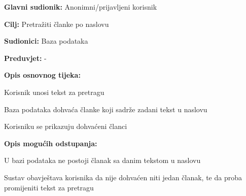 \noindent {}
\begin{packed_item}

\item \textbf{Glavni sudionik:} Anonimni/prijavljeni korisnik
\item  \textbf{Cilj:} Pretražiti članke po naslovu
\item  \textbf{Sudionici:} Baza podataka
\item  \textbf{Preduvjet:} -
\item  \textbf{Opis osnovnog tijeka:}

\item[] \begin{packed_enum}

    \item Korisnik unosi tekst za pretragu
    \item Baza podataka dohvaća članke koji sadrže zadani tekst u naslovu
    \item Korisniku se prikazuju dohvaćeni članci

\end{packed_enum}

\item  \textbf{Opis mogućih odstupanja:}

\item[] \begin{packed_item}

    \item[2.a] U bazi podataka ne postoji članak sa danim tekstom u naslovu

    \item[] \begin{packed_enum}

        \item Sustav obavještava korisnika da nije dohvaćen niti jedan članak, te da proba promijeniti tekst za pretragu

    \end{packed_enum}

\end{packed_item}

\end{packed_item}

